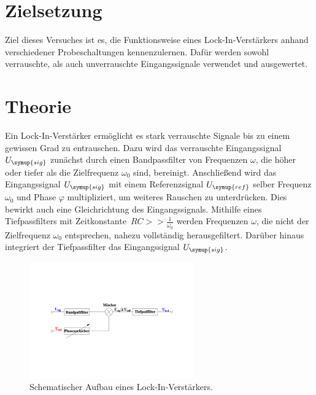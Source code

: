 \section{Zielsetzung}
\label{sec:Zielsetzung}
Ziel dieses Versuches ist es, die Funktionsweise eines Lock-In-Verstärkers anhand verschiedener Probeschaltungen 
kennenzulernen. Dafür werden sowohl verrauschte, als auch unverrauschte Eingangssignale verwendet und ausgewertet.

\section{Theorie}
\label{sec:Theorie}
Ein Lock-In-Verstärker ermöglicht es stark verrauschte Signale bis zu einem gewissen Grad zu entrauschen. Dazu wird
das verrauschte Eingangssignal $U_{\symup{sig}}$ zunächst durch einen Bandpassfilter von Frequenzen $\omega$, die höher 
oder tiefer als die Zielfrequenz $\omega_{0}$ sind, bereinigt. Anschließend wird das Eingangssignal $U_{\symup{sig}}$ mit 
einem Referenzsignal $U_{\symup{ref}}$ selber Frequenz $\omega_{0}$ und Phase $\varphi$ multipliziert, um weiteres Rauschen 
zu unterdrücken. Dies bewirkt auch eine Gleichrichtung des Eingangssignals. Mithilfe eines Tiefpassfilters mit 
Zeitkonstante~$RC >> \frac{1}{\omega_{0}}$ werden Frequenzen $\omega$, die nicht der Zielfrequenz $\omega_{0}$ entsprechen,
nahezu vollständig herausgefiltert. Darüber hinaus integriert der Tiefpassfilter das Eingangssignal $U_{\symup{sig}}$.

\begin{figure} [H]
    \centering
    \includegraphics[height=5cm]{content/Bilder/Aufbau_LockInVerstaerker.pdf}
    \caption{Schematischer Aufbau eines Lock-In-Verstärkers.\cite{v303}}
    \label{fig:Aufbau}
\end{figure}

